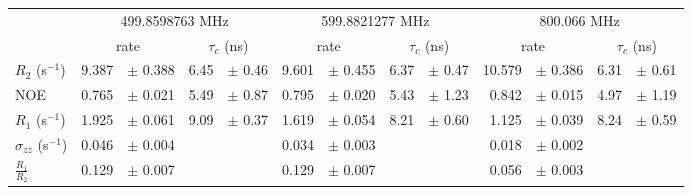 \documentclass[showkeys,aps,prb,prepreint,amssymb, amsmath,nobibnotes]{article}
\begin{document}
\begin{small}
\noindent \begin{tabular}{l|rlrl|rlrl|rlrl}
& \multicolumn{4}{c}{499.8598763 MHz}& \multicolumn{4}{c}{599.8821277 MHz}& \multicolumn{4}{c}{800.066 MHz}\\
&  \multicolumn{2}{c}{rate} & \multicolumn{2}{c}{$\tau_c$ (ns)}   &  \multicolumn{2}{c}{rate} & \multicolumn{2}{c}{$\tau_c$ (ns)}   &  \multicolumn{2}{c}{rate} & \multicolumn{2}{c}{$\tau_c$ (ns)}   \\
\hline$R_2$  (s$^{-1}$)  &  9.387 & $\pm$ 0.388   &  6.45 & $\pm$ 0.46 &  9.601 & $\pm$ 0.455   &  6.37 & $\pm$ 0.47 &  10.579 & $\pm$ 0.386   &  6.31 & $\pm$ 0.61 \\
NOE  &  0.765 & $\pm$ 0.021   &  5.49 & $\pm$ 0.87 &  0.795 & $\pm$ 0.020   &  5.43 & $\pm$ 1.23 &  0.842 & $\pm$ 0.015   &  4.97 & $\pm$ 1.19 \\
$R_1$ (s$^{-1}$)  &  1.925 & $\pm$ 0.061   &  9.09 & $\pm$ 0.37 &  1.619 & $\pm$ 0.054   &  8.21 & $\pm$ 0.60 &  1.125 & $\pm$ 0.039   &  8.24 & $\pm$ 0.59 \\
$\sigma_{zz}$  (s$^{-1}$)  &  0.046 & $\pm$ 0.004   & & &  0.034 & $\pm$ 0.003   & & &  0.018 & $\pm$ 0.002   & & \\
$\frac{R_1}{R_2}$  &  0.129 & $\pm$ 0.007   & & &  0.129 & $\pm$ 0.007   & & &  0.056 & $\pm$ 0.003   & & \\
\end{tabular}
\end{small}
\end{document}

